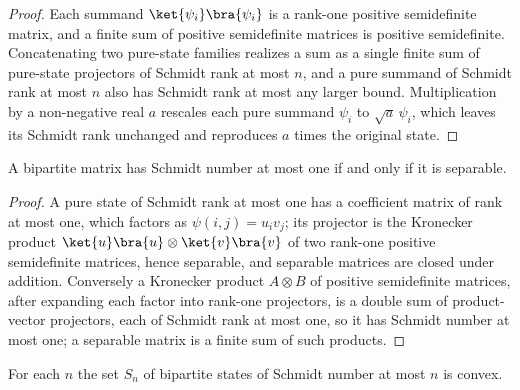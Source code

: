 \begin{proof}
    \leanok
    Each summand $\ket{\psi_i}\bra{\psi_i}$ is a rank-one positive semidefinite
    matrix, and a finite sum of positive semidefinite matrices is positive
    semidefinite. Concatenating two pure-state families realizes a sum as a single
    finite sum of pure-state projectors of Schmidt rank at most $n$, and a pure
    summand of Schmidt rank at most $n$ also has Schmidt rank at most any larger
    bound. Multiplication by a non-negative real $a$ rescales each pure summand
    $\psi_i$ to $\sqrt a\,\psi_i$, which leaves its Schmidt rank unchanged and
    reproduces $a$ times the original state.
\end{proof}

\begin{theorem}
    \label{thm:has_schmidt_number_le_one_iff_separable}
    \leanok
    A bipartite matrix has Schmidt number at most one if and only if it is separable.
\end{theorem}

\begin{proof}
    \leanok
    A pure state of Schmidt rank at most one has a coefficient matrix of rank at most
    one, which factors as $\psi(i,j)=u_i v_j$; its projector is the Kronecker product
    $\ket{u}\bra{u}\otimes\ket{v}\bra{v}$ of two rank-one positive semidefinite
    matrices, hence separable, and separable matrices are closed under addition.
    Conversely a Kronecker product $A\otimes B$ of positive semidefinite matrices,
    after expanding each factor into rank-one projectors, is a double sum of
    product-vector projectors, each of Schmidt rank at most one, so it has Schmidt
    number at most one; a separable matrix is a finite sum of such products.
\end{proof}

\begin{theorem}
    \label{thm:convex_setOf_has_schmidt_number_le}
    \leanok
    For each $n$ the set $S_n$ of bipartite states of Schmidt number at most $n$ is
    convex.
\end{theorem}

